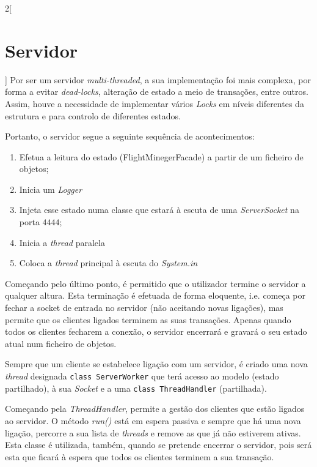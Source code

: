 \documentclass[a4paper,11pt]{article}
\begin{document}
\begin{multicols}{2}[\section{Servidor}]
    Por ser um servidor \textit{multi-threaded}, a sua implementação foi
    mais complexa, por forma a evitar \textit{dead-locks}, alteração de estado
    a meio de transações, entre outros.
    Assim, houve a necessidade de implementar vários \textit{Locks} em níveis
    diferentes da estrutura e para controlo de diferentes estados.
    
    Portanto, o servidor segue a seguinte sequência de acontecimentos:
    \begin{enumerate}
        \item Efetua a leitura do estado (FlightMinegerFacade) a partir de um ficheiro de objetos;
        \item Inicia um \textit{Logger}
        \item Injeta esse estado numa classe que estará à escuta de uma \textit{ServerSocket} na porta $4444$;
        \item Inicia a \textit{thread} paralela
        \item Coloca a \textit{thread} principal à escuta do \textit{System.in}
    \end{enumerate}
    Começando pelo último ponto, é permitido que o utilizador termine o servidor a qualquer
    altura. Esta terminação é efetuada de forma eloquente, i.e. começa por fechar a socket
    de entrada no servidor (não aceitando novas ligações), mas permite que os clientes ligados terminem as suas transações.
    Apenas quando todos os clientes fecharem a conexão, o servidor encerrará e gravará 
    o seu estado atual num ficheiro de objetos.
    
    Sempre que um cliente se estabelece ligação com um servidor, é criado uma
    nova \textit{thread} designada \texttt{class ServerWorker}
    que terá acesso ao modelo (estado partilhado), à sua \textit{Socket}
    e a uma \texttt{class ThreadHandler} (partilhada).
    
    Começando pela \textit{ThreadHandler}, permite a gestão dos clientes que estão
    ligados ao servidor.
    O método \textit{run()} está em espera passiva e sempre que há uma nova ligação,
    percorre a sua lista de \textit{threads} e remove as que já não estiverem ativas.
    Esta classe é utilizada, também, quando se pretende encerrar o servidor, pois será
    esta que ficará à espera que todos os clientes terminem a sua transação.
    

\end{multicols}
\end{document}

